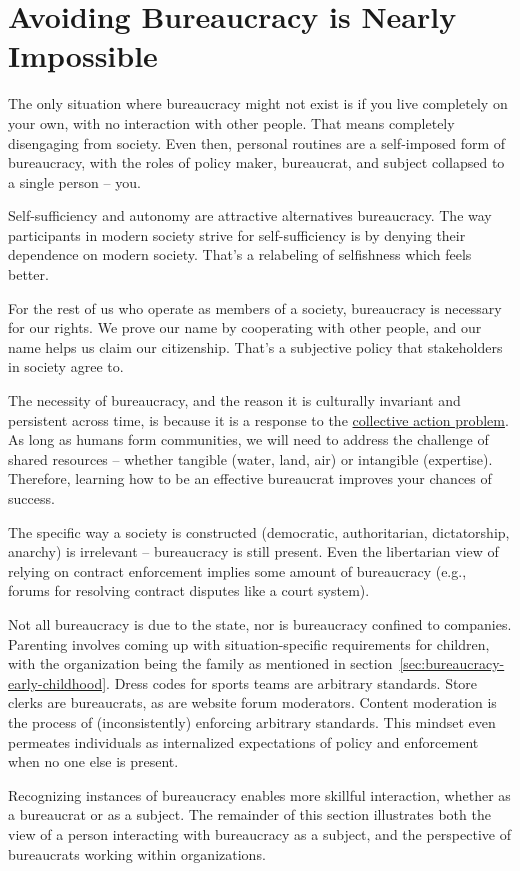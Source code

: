 \section{Avoiding Bureaucracy is Nearly Impossible}

The only situation where bureaucracy might not exist is if you live completely on your own, with no interaction with other people. That means completely disengaging from society. Even then, personal routines are a self-imposed form of bureaucracy, with the roles of policy maker, bureaucrat, and subject collapsed to a single person -- you.

Self-sufficiency and autonomy are attractive alternatives bureaucracy. The way participants in modern society strive for self-sufficiency is by denying their dependence on modern society. That's a relabeling of selfishness which feels better. 

For the rest of us who operate as members of a society, bureaucracy is necessary for our rights. We prove our name by cooperating with other people, and our name helps us claim our citizenship. That's a subjective policy that \glspl{stakeholder} in society agree to. 

The necessity of bureaucracy, and the reason it is culturally invariant and persistent across time, is because it is a response to the 
\href{https://en.wikipedia.org/wiki/Collective_action_problem}{collective action problem}. As long as humans form communities, we will need to address the challenge of shared resources -- whether tangible (water, land, air) or intangible (expertise). Therefore, learning how to be an effective bureaucrat improves your chances of success. 

The specific way a society is constructed (democratic, authoritarian, dictatorship, anarchy) is irrelevant -- bureaucracy is still present. Even the libertarian view of relying on contract enforcement implies some amount of bureaucracy (e.g., forums for resolving contract disputes like a court system). 


Not all bureaucracy is due to the state, nor is bureaucracy confined to companies. Parenting involves coming up with situation-specific requirements for children, with the organization being the family as mentioned in section~\ref{sec:bureaucracy-early-childhood}. Dress codes for sports teams are arbitrary standards. 
Store clerks are bureaucrats, as are website forum moderators.  Content moderation is the process of (inconsistently) enforcing arbitrary standards. This mindset even permeates individuals as internalized expectations of policy and enforcement when no one else is present. 

Recognizing instances of bureaucracy enables more skillful interaction, whether as a bureaucrat or as a subject. The remainder of this section  illustrates both the view of a person interacting with bureaucracy as a \gls{subject}, and the perspective of bureaucrats working within organizations. 




